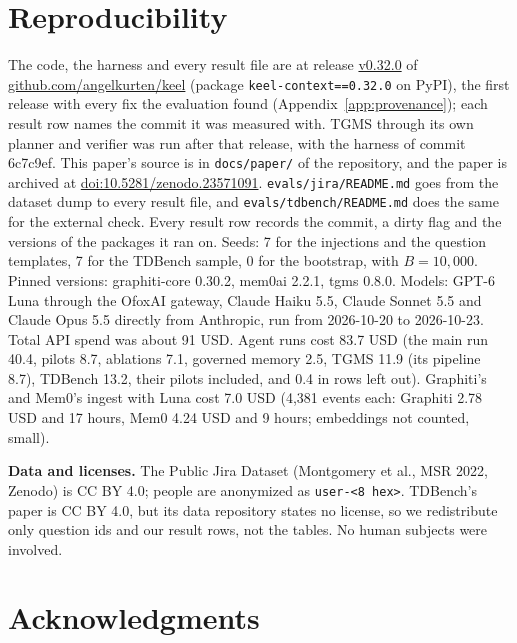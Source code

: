 \documentclass{article}
\newcommand{\code}[1]{\texttt{#1}}
\begin{document}
\section*{Reproducibility}
\label{sec:repro}

The code, the harness and every result file are at release \href{https://github.com/angelkurten/keel/releases/tag/v0.32.0}{v0.32.0} of \href{https://github.com/angelkurten/keel}{github.com/angelkurten/keel} (package \code{keel-context==0.32.0} on PyPI), the first release with every fix the evaluation found (Appendix~\ref{app:provenance}); each result row names the commit it was measured with. TGMS through its own planner and verifier was run after that release, with the harness of commit 6c7c9ef. This paper's source is in \code{docs/paper/} of the repository, and the paper is archived at \href{https://doi.org/10.5281/zenodo.23571091}{doi:10.5281/zenodo.23571091}. \code{evals/jira/README.md} goes from the dataset dump to every result file, and \code{evals/tdbench/README.md} does the same for the external check. Every result row records the commit, a dirty flag and the versions of the packages it ran on. Seeds: 7 for the injections and the question templates, 7 for the TDBench sample, 0 for the bootstrap, with $B = 10{,}000$. Pinned versions: graphiti-core 0.30.2, mem0ai 2.2.1, tgms 0.8.0. Models: GPT-6 Luna through the OfoxAI gateway, Claude Haiku 5.5, Claude Sonnet 5.5 and Claude Opus 5.5 directly from Anthropic, run from 2026-10-20 to 2026-10-23. Total API spend was about 91 USD. Agent runs cost 83.7 USD (the main run 40.4, pilots 8.7, ablations 7.1, governed memory 2.5, TGMS 11.9 (its pipeline 8.7), TDBench 13.2, their pilots included, and 0.4 in rows left out). Graphiti's and Mem0's ingest with Luna cost 7.0 USD (4,381 events each: Graphiti 2.78 USD and 17 hours, Mem0 4.24 USD and 9 hours; embeddings not counted, small).

\textbf{Data and licenses.} The Public Jira Dataset (Montgomery et al., MSR 2022, Zenodo) is CC BY 4.0; people are anonymized as \code{user-<8 hex>}. TDBench's paper is CC BY 4.0, but its data repository states no license, so we redistribute only question ids and our result rows, not the tables. No human subjects were involved.

\section*{Acknowledgments}
\end{document}
